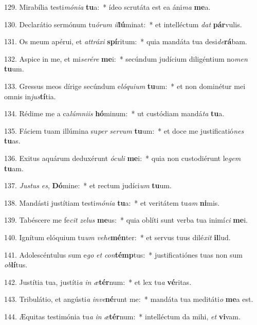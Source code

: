 129. Mirabília testi\textit{mó}\textit{ni}\textit{a} \textbf{tu}a:~*  ídeo scrutáta est ea áni\textit{ma} \textbf{me}a.\

130. Declarátio sermónum tu\textit{ó}\textit{rum} \textit{il}\textbf{lú}minat:~*  et intelléctum \textit{dat} \textbf{pár}vulis.\

131. Os meum apérui, et \textit{at}\textit{trá}\textit{xi} \textbf{spí}ritum:~*  quia mandáta tua desi\textit{de}\textbf{rá}bam.\

132. Aspice in me, et mi\textit{se}\textit{ré}\textit{re} \textbf{me}i:~*  secúndum judícium diligéntium no\textit{men} \textbf{tu}um.\

133. Gressus meos dírige secúndum e\textit{ló}\textit{qui}\textit{um} \textbf{tu}um:~*  et non dominétur mei omnis in\textit{jus}\textbf{tí}tia.\

134. Rédime me a ca\textit{lúm}\textit{ni}\textit{is} \textbf{hó}minum:~*  ut custódiam mandá\textit{ta} \textbf{tu}a.\

135. Fáciem tuam illúmina su\textit{per} \textit{ser}\textit{vum} \textbf{tu}um:~*  et doce me justificatió\textit{nes} \textbf{tu}as.\

136. Exitus aquárum deduxérunt \textit{ó}\textit{cu}\textit{li} \textbf{me}i:~*  quia non custodiérunt le\textit{gem} \textbf{tu}am.\

137. \textit{Jus}\textit{tus} \textit{es}, \textbf{Dó}mine:~*  et rectum judíci\textit{um} \textbf{tu}um.\

138. Mandásti justítiam testi\textit{mó}\textit{ni}\textit{a} \textbf{tu}a:~*  et veritátem tu\textit{am} \textbf{ni}mis.\

139. Tabéscere me fe\textit{cit} \textit{ze}\textit{lus} \textbf{me}us:~*  quia oblíti sunt verba tua inimí\textit{ci} \textbf{me}i.\

140. Ignítum elóquium tu\textit{um} \textit{ve}\textit{he}\textbf{mén}ter:~*  et servus tuus dilé\textit{xit} \textbf{il}lud.\

141. Adolescéntulus sum e\textit{go} \textit{et} \textit{con}\textbf{témp}tus:~*  justificatiónes tuas non sum \textit{ob}\textbf{lí}tus.\

142. Justítia tua, justíti\textit{a} \textit{in} \textit{æ}\textbf{tér}num:~*  et lex tu\textit{a} \textbf{vé}ritas.\

143. Tribulátio, et angústi\textit{a} \textit{in}\textit{ve}\textbf{né}runt me:~*  mandáta tua meditáti\textit{o} \textbf{me}a est.\

144. Æquitas testimónia tu\textit{a} \textit{in} \textit{æ}\textbf{tér}num:~*  intelléctum da mihi, \textit{et} \textbf{vi}vam.\

